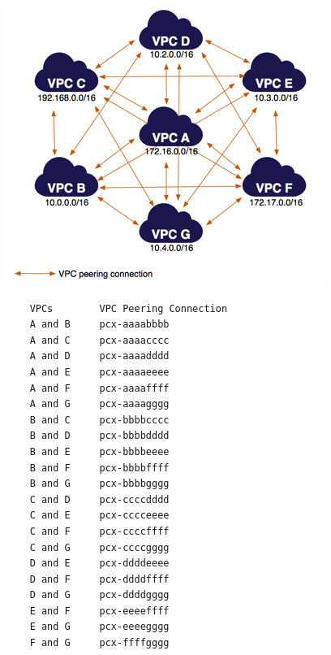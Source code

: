 \documentclass[aspectratio=169,20pt]{beamer}
\begin{document}
\begin{frame}{}
    \begin{center}
    \includegraphics[height=0.8\paperheight]{images/many-vpcs-peered-diagram.png}
    \end{center}
\end{frame}

%
%
\begin{frame}[fragile]{}
    \begin{lstlisting}
    VPCs        VPC Peering Connection
    A and B     pcx-aaaabbbb
    A and C     pcx-aaaacccc
    A and D     pcx-aaaadddd
    A and E     pcx-aaaaeeee
    A and F     pcx-aaaaffff
    A and G     pcx-aaaagggg
    B and C     pcx-bbbbcccc
    B and D     pcx-bbbbdddd
    B and E     pcx-bbbbeeee
    B and F     pcx-bbbbffff
    B and G     pcx-bbbbgggg
    C and D     pcx-ccccdddd
    C and E     pcx-cccceeee
    C and F     pcx-ccccffff
    C and G     pcx-ccccgggg
    D and E     pcx-ddddeeee
    D and F     pcx-ddddffff
    D and G     pcx-ddddgggg
    E and F     pcx-eeeeffff
    E and G     pcx-eeeegggg
    F and G     pcx-ffffgggg
    \end{lstlisting}
\end{frame}
\end{document}
